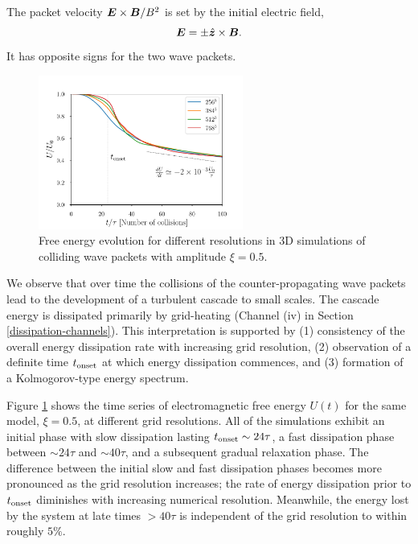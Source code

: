 The packet velocity $\boldsymbol{E}\times\boldsymbol{B}/B^2$ is set by the initial electric field,
%
\begin{equation}
  \boldsymbol{E} = \pm \hat{\boldsymbol{z}} \times \boldsymbol{B}.
\end{equation}
%
It has opposite signs for the two wave packets.

\begin{figure}[h]
\centering
\includegraphics[width=0.6\textwidth]{pics/chap4/convergence3D}
\caption[Free energy evolution for different resolutions in 3D simulations]{Free energy evolution for different resolutions in 3D simulations of colliding \alfven wave packets with amplitude $\xi=0.5$.}
\label{energy3D}
\end{figure}

We observe that over time the collisions of the counter-propagating \alfven wave packets lead to the development of a turbulent cascade to small scales. The cascade energy is dissipated primarily by grid-heating (Channel (iv) in Section \ref{dissipation-channels}). 
This interpretation is supported by (1) consistency of the overall energy dissipation rate with increasing grid resolution, (2) observation of a definite time $t_{\rm onset}$ at which energy dissipation commences, and (3) formation of a Kolmogorov-type energy spectrum.

Figure \ref{energy3D} shows the time series of electromagnetic free energy $U(t)$ for the same model, $\xi = 0.5$, at different grid resolutions. 
All of the simulations exhibit an initial phase with slow dissipation lasting $t_{\rm onset}\sim 24 \tau$, a fast dissipation phase between $\sim 24\tau$ and $\sim 40\tau$, and a subsequent gradual relaxation phase. 
The difference between the initial slow and fast dissipation phases becomes more pronounced as the grid resolution increases; the rate of energy dissipation prior to $t_{\rm onset}$ diminishes with increasing numerical resolution. 
Meanwhile, the energy lost by the system at late times $>40\tau$ is independent of the grid resolution to within roughly $5\%$.

